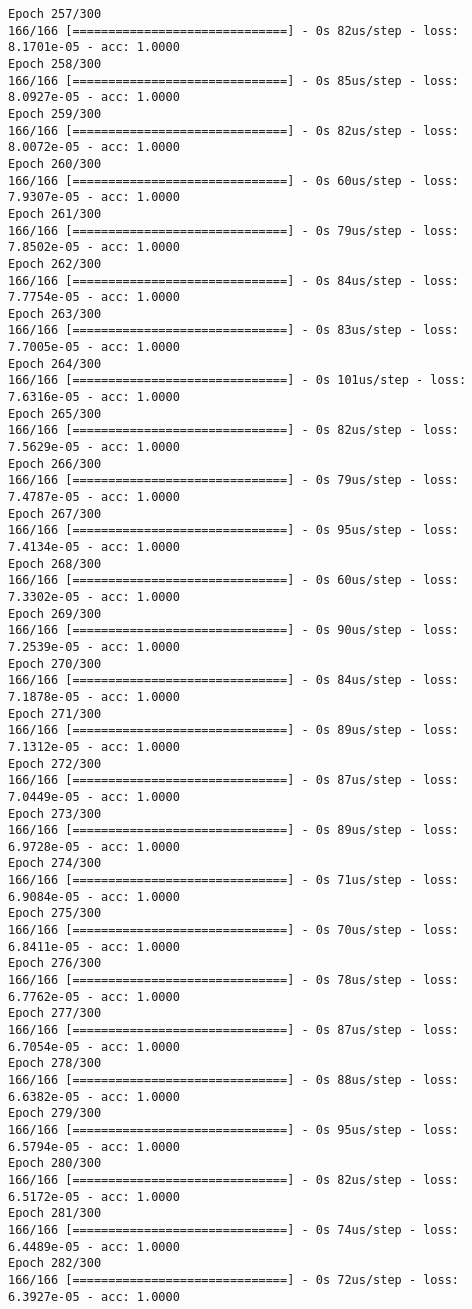 \documentclass[11pt]{article}
\begin{document}
\begin{Verbatim}[commandchars=\\\{\}]
Epoch 257/300
166/166 [==============================] - 0s 82us/step - loss: 8.1701e-05 - acc: 1.0000
Epoch 258/300
166/166 [==============================] - 0s 85us/step - loss: 8.0927e-05 - acc: 1.0000
Epoch 259/300
166/166 [==============================] - 0s 82us/step - loss: 8.0072e-05 - acc: 1.0000
Epoch 260/300
166/166 [==============================] - 0s 60us/step - loss: 7.9307e-05 - acc: 1.0000
Epoch 261/300
166/166 [==============================] - 0s 79us/step - loss: 7.8502e-05 - acc: 1.0000
Epoch 262/300
166/166 [==============================] - 0s 84us/step - loss: 7.7754e-05 - acc: 1.0000
Epoch 263/300
166/166 [==============================] - 0s 83us/step - loss: 7.7005e-05 - acc: 1.0000
Epoch 264/300
166/166 [==============================] - 0s 101us/step - loss: 7.6316e-05 - acc: 1.0000
Epoch 265/300
166/166 [==============================] - 0s 82us/step - loss: 7.5629e-05 - acc: 1.0000
Epoch 266/300
166/166 [==============================] - 0s 79us/step - loss: 7.4787e-05 - acc: 1.0000
Epoch 267/300
166/166 [==============================] - 0s 95us/step - loss: 7.4134e-05 - acc: 1.0000
Epoch 268/300
166/166 [==============================] - 0s 60us/step - loss: 7.3302e-05 - acc: 1.0000
Epoch 269/300
166/166 [==============================] - 0s 90us/step - loss: 7.2539e-05 - acc: 1.0000
Epoch 270/300
166/166 [==============================] - 0s 84us/step - loss: 7.1878e-05 - acc: 1.0000
Epoch 271/300
166/166 [==============================] - 0s 89us/step - loss: 7.1312e-05 - acc: 1.0000
Epoch 272/300
166/166 [==============================] - 0s 87us/step - loss: 7.0449e-05 - acc: 1.0000
Epoch 273/300
166/166 [==============================] - 0s 89us/step - loss: 6.9728e-05 - acc: 1.0000
Epoch 274/300
166/166 [==============================] - 0s 71us/step - loss: 6.9084e-05 - acc: 1.0000
Epoch 275/300
166/166 [==============================] - 0s 70us/step - loss: 6.8411e-05 - acc: 1.0000
Epoch 276/300
166/166 [==============================] - 0s 78us/step - loss: 6.7762e-05 - acc: 1.0000
Epoch 277/300
166/166 [==============================] - 0s 87us/step - loss: 6.7054e-05 - acc: 1.0000
Epoch 278/300
166/166 [==============================] - 0s 88us/step - loss: 6.6382e-05 - acc: 1.0000
Epoch 279/300
166/166 [==============================] - 0s 95us/step - loss: 6.5794e-05 - acc: 1.0000
Epoch 280/300
166/166 [==============================] - 0s 82us/step - loss: 6.5172e-05 - acc: 1.0000
Epoch 281/300
166/166 [==============================] - 0s 74us/step - loss: 6.4489e-05 - acc: 1.0000
Epoch 282/300
166/166 [==============================] - 0s 72us/step - loss: 6.3927e-05 - acc: 1.0000

\end{Verbatim}
\end{document}
